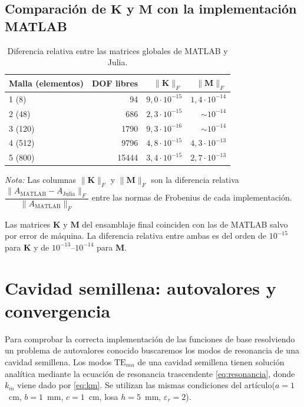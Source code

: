 \documentclass[12pt]{report} %
\begin{document}
\subsection{Comparación de $\mathbf{K}$ y $\mathbf{M}$ con la implementación MATLAB}\label{sec:res-KM}

\begin{table}[htbp]
	\centering
	\caption{Diferencia relativa entre las matrices globales de MATLAB y Julia.}
	\label{tab:KM}
	\begin{tabular}{lrrr}
		\toprule
		\textbf{Malla (elementos)} & \textbf{DOF libres} & $\|\mathbf{K}\|_F$ & $\|\mathbf{M}\|_F$ \\
		\midrule
		1 (8)   & 94    & $9{,}0\cdot10^{-15}$ & $1{,}4\cdot10^{-14}$ \\
		2 (48)  & 686   & $2{,}3\cdot10^{-15}$ & $\sim 10^{-14}$ \\
		3 (120) & 1790  & $9{,}3\cdot10^{-16}$ & $\sim 10^{-14}$ \\
		4 (512) & 9796  & $4{,}8\cdot10^{-15}$ & $4{,}3\cdot10^{-13}$ \\
		5 (800) & 15444 & $3{,}4\cdot10^{-15}$ & $2{,}7\cdot10^{-13}$ \\
		\bottomrule
	\end{tabular}
	\vspace{1ex}

	\parbox{\linewidth}{\small\textit{Nota:} Las columnas $\|\mathbf{K}\|_F$ y $\|\mathbf{M}\|_F$ son la diferencia relativa $\dfrac{\|A_{\mathrm{MATLAB}}-A_{\mathrm{Julia}}\|_F}{\|A_{\mathrm{MATLAB}}\|_F}$ entre las normas de Frobenius de cada implementación.}
\end{table}
	
Las matrices $\mathbf{K}$ y $\mathbf{M}$ del ensamblaje final coinciden con las de MATLAB salvo por error de máquina. La diferencia relativa entre ambas es del orden de $10^{-15}$ para $\mathbf{K}$ y de $10^{-13}$--$10^{-14}$ para $\mathbf{M}$.


\section{Cavidad semillena: autovalores y convergencia}\label{sec:res-cavidad}

Para comprobar la correcta implementación de las funciones de base resolviendo un problema de autovalores conocido buscaremos los modos de resonancia de una cavidad semillena. Los modos $\mathrm{TE}_{mn}$ de una cavidad semillena tienen solución analítica mediante la ecuación de resonancia trascendente \eqref{eq:resonancia}, donde $k_m$ viene dado por \eqref{eq:km}. Se utilizan las mismas condiciones del artículo($a=1$~cm, $b=1$~mm, $c=1$~cm, losa $h=5$~mm, $\varepsilon_r=2$).
\end{document}
